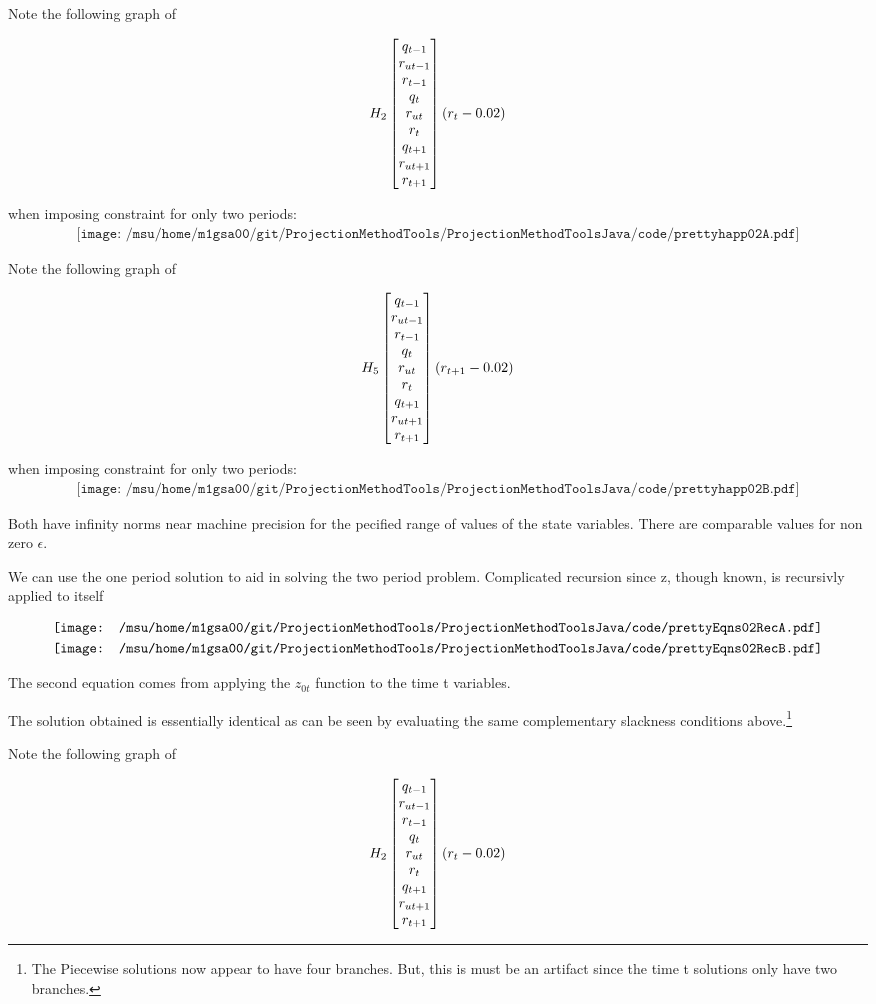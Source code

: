  Note the following graph of 

 \begin{gather*}
 H_{2}\begin{bmatrix} q_{t-1}\\r_{ut-1}\\r_{t-1}\\ q_{t}\\r_{ut}\\r_{t}\\ q_{t+1}\\r_{ut+1}\\r_{t+1} \end{bmatrix} ( r_t-0.02)
 \end{gather*}

  when imposing constraint for only two periods:
 \begin{gather*}
 \texttt{[image: /msu/home/m1gsa00/git/ProjectionMethodTools/ProjectionMethodToolsJava/code/prettyhapp02A.pdf]}
 \end{gather*}


 Note the following graph of 

 \begin{gather*}
 H_{5}\begin{bmatrix} q_{t-1}\\r_{ut-1}\\r_{t-1}\\ q_{t}\\r_{ut}\\r_{t}\\ q_{t+1}\\r_{ut+1}\\r_{t+1} \end{bmatrix}( r_{t+1}-0.02)
 \end{gather*}

  when imposing constraint for only two periods:
 \begin{gather*}
 \texttt{[image: /msu/home/m1gsa00/git/ProjectionMethodTools/ProjectionMethodToolsJava/code/prettyhapp02B.pdf]}
 \end{gather*}


Both have infinity norms near machine precision for the pecified range of values of the state variables.  There are comparable values for non zero $\epsilon$.


We can use the one period solution to aid in solving the two period problem.
Complicated recursion since z, though known, is recursivly applied to itself


\begin{gather*}
  \vcenter{\hbox{\texttt{[image: /msu/home/m1gsa00/git/ProjectionMethodTools/ProjectionMethodToolsJava/code/prettyEqns02RecA.pdf]}}}\\
  \vcenter{\hbox{\texttt{[image: /msu/home/m1gsa00/git/ProjectionMethodTools/ProjectionMethodToolsJava/code/prettyEqns02RecB.pdf]}}}\\
\end{gather*}

The second equation comes from applying the $z_{0t}$ function to the time t variables.


The solution obtained is essentially identical as can be seen by evaluating the
same complementary slackness conditions above.\footnote{The Piecewise solutions now appear to have four branches.  But, this
 is must be an artifact since the time t solutions only have two branches.}


 Note the following graph of 

 \begin{gather*}
 H_{2}\begin{bmatrix} q_{t-1}\\r_{ut-1}\\r_{t-1}\\ q_{t}\\r_{ut}\\r_{t}\\ q_{t+1}\\r_{ut+1}\\r_{t+1} \end{bmatrix} ( r_t-0.02)
 \end{gather*}

